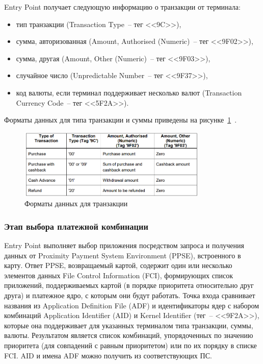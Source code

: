 Entry Point получает следующую информацию о транзакции от терминала:

\begin{itemize}
    \item тип транзакции (Transaction Type~-- тег <<9C>>),
    \item сумма, авторизованная (Amount, Authorised (Numeric)~-- тег <<9F02>>),
    \item сумма, другая (Amount, Other (Numeric)~-- тег <<9F03>>),
    \item случайное число (Unpredictable Number~-- тег <<9F37>>),
    \item код валюты, если терминал поддерживает несколько валют (Transaction Currency Code~-- тег <<5F2A>>).
\end{itemize}

Форматы данных для типа транзакции и суммы приведены на рисунке~\ref{fig:transaction_types}~\cite{emv_book_A}.

\begin{figure}[H]
    \centering
    \includegraphics[width=0.8\textwidth]{images/research/transaction_types}
    \caption{\centering Форматы данных для транзакции}
    \label{fig:transaction_types}
\end{figure}


\subsubsection{Этап выбора платежной комбинации}
\label{subsubsec:protocol_activation}

Entry Point выполняет выбор приложения посредством запроса и получения данных от Proximity Payment System Environment (PPSE), встроенного в карту.
Ответ PPSE, возвращаемый картой, содержит один или несколько элементов данных File Control Information (FCI), формирующих список приложений, поддерживаемых картой (в порядке приоритета относительно друг друга) и платежное ядро, с которым они будут работать.
Точка входа сравнивает названия из Application Definition File (ADF) и идентификаторы ядер с набором комбинаций Application Identifier (AID) и Kernel Identifier (тег~-- <<9F2A>>), которые она поддерживает для указанных терминалом типа транзакции, суммы, валюты.
Результатом является список комбинаций, упорядоченных по значению приоритета (для совпадений с равным приоритетом) или по их порядку в списке FCI.
AID и имена ADF можно получить из соответствующих ПС.

